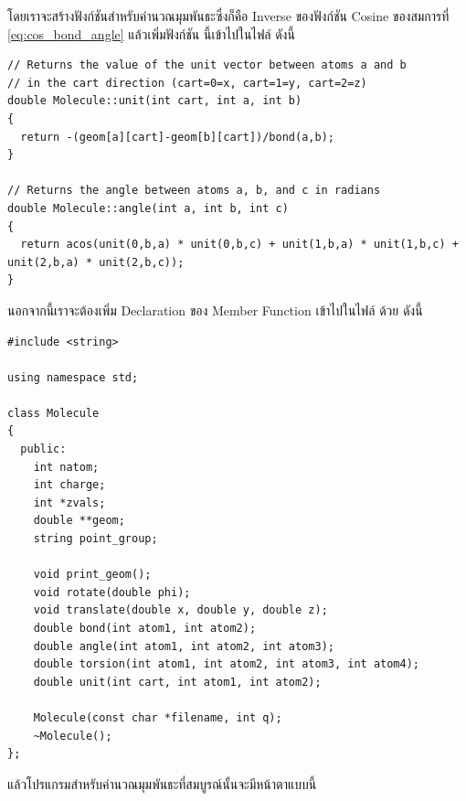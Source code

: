 \vspace{5pt}

โดยเราจะสร้างฟังก์ชันสำหรับคำนวณมุมพันธะซึ่งก็คือ Inverse ของฟังก์ชัน Cosine ของสมการที่ \eqref{eq:cos_bond_angle} แล้วเพิ่มฟังก์ชัน%
นี้เข้าไปในไฟล์  ดังนี้

\vspace{5pt}

\begin{lstlisting}[style=MyC++]
// Returns the value of the unit vector between atoms a and b
// in the cart direction (cart=0=x, cart=1=y, cart=2=z)
double Molecule::unit(int cart, int a, int b)
{
  return -(geom[a][cart]-geom[b][cart])/bond(a,b);
}

// Returns the angle between atoms a, b, and c in radians
double Molecule::angle(int a, int b, int c)
{
  return acos(unit(0,b,a) * unit(0,b,c) + unit(1,b,a) * unit(1,b,c) + unit(2,b,a) * unit(2,b,c));
}
\end{lstlisting}

\vspace{5pt}

\noindent นอกจากนี้เราจะต้องเพิ่ม Declaration ของ Member Function เข้าไปในไฟล์  ด้วย ดังนี้

\vspace{5pt}

\begin{lstlisting}[style=MyC++]
#include <string>

using namespace std;

class Molecule
{
  public:
    int natom;
    int charge;
    int *zvals;
    double **geom;
    string point_group;

    void print_geom();
    void rotate(double phi);
    void translate(double x, double y, double z);
    double bond(int atom1, int atom2);
    double angle(int atom1, int atom2, int atom3);
    double torsion(int atom1, int atom2, int atom3, int atom4);
    double unit(int cart, int atom1, int atom2);

    Molecule(const char *filename, int q);
    ~Molecule();
};
\end{lstlisting}

\vspace{5pt}

แล้วโปรแกรมสำหรับคำนวณมุมพันธะที่สมบูรณ์นั้นจะมีหน้าตาแบบนี้

\vspace{5pt}

